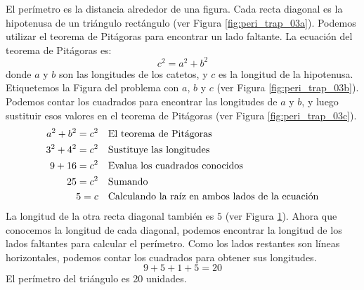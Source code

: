 \begin{solutionbox}{14cm}
\begin{minipage}{0.3\textwidth}
\begin{figure}[H]
            \caption{}
            \label{fig:peri_trap_03d}
        \end{figure}
    \end{minipage}\hfill
    \begin{minipage}{0.6\textwidth}
        El perímetro es la distancia alrededor de una figura.
        Cada recta diagonal es la hipotenusa de un triángulo rectángulo (ver Figura \ref{fig:peri_trap_03a}).
        Podemos utilizar el teorema de Pitágoras para encontrar un lado faltante.
        La ecuación del teorema de Pitágoras es:
        \[c^2=a^2+b^2\]
        donde $a$ y $b$ son las longitudes de los catetos, y $c$ es la longitud de la hipotenusa.
        Etiquetemos la Figura del problema con $a$, $b$ y $c$ (ver Figura \ref{fig:peri_trap_03b}).
        Podemos contar los cuadrados para encontrar las longitudes de $a$ y $b$, y luego sustituir esos valores en el teorema de Pitágoras (ver Figura \ref{fig:peri_trap_03c}).
        \begin{align*}
            a^2+b^2  =c^2 & \text{\quad El teorema de Pitágoras}                          \\
            3^2+4^2  =c^2 & \text{\quad Sustituye las longitudes}                         \\
            9 +16 =c^2    & \text{\quad Evalua los cuadrados conocidos}                   \\
            25=c^2        & \text{\quad Sumando }                                         \\
            5=c           & \text{\quad Calculando la raíz en ambos lados de la ecuación} \\
        \end{align*}
        La longitud de la otra recta diagonal también es $5$ (ver Figura \ref{fig:peri_trap_03d}).
        Ahora que conocemos la longitud de cada diagonal, podemos encontrar la longitud de los lados faltantes para calcular el perímetro.
        Como los lados restantes son líneas horizontales, podemos contar los cuadrados para obtener sus longitudes.
        \[9+5+1+5=20\]
        El perímetro del triángulo es 20 unidades.
    \end{minipage}
\end{solutionbox}
